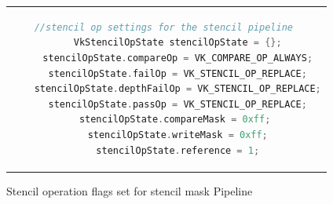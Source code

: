 \begin{figure}[htb]
  \centering
  \begin{tabular}{c}
  \begin{lstlisting}[language=C++]
	//stencil op settings for the stencil pipeline 
	VkStencilOpState stencilOpState = {};
	stencilOpState.compareOp = VK_COMPARE_OP_ALWAYS;
	stencilOpState.failOp = VK_STENCIL_OP_REPLACE;
	stencilOpState.depthFailOp = VK_STENCIL_OP_REPLACE;
	stencilOpState.passOp = VK_STENCIL_OP_REPLACE;
	stencilOpState.compareMask = 0xff; 
	stencilOpState.writeMask = 0xff;
	stencilOpState.reference = 1;
	\end{lstlisting}
  \end{tabular}
  \caption[Stencil pipeline stencil operation flags]{Stencil operation flags set for stencil mask Pipeline}\label{fig:lst_StencilOpState_StencilPipeline}
\end{figure}
